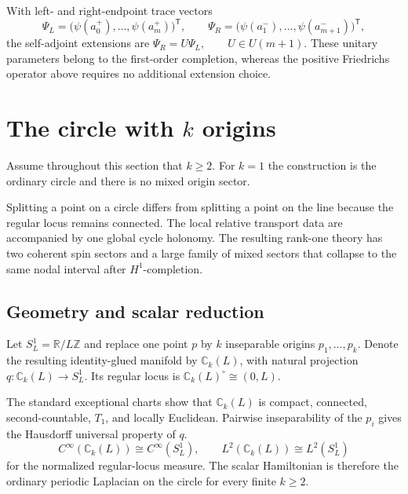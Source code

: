 \documentclass[11pt]{article}
\theoremstyle{plain}
\theoremstyle{definition}
\begin{document}
With left- and right-endpoint trace vectors
\[
  \Psi_L
  =
  \bigl(
    \psi(a_0^+),\ldots,\psi(a_m^+)
  \bigr)^{\mathsf T},
  \qquad
  \Psi_R
  =
  \bigl(
    \psi(a_1^-),\ldots,\psi(a_{m+1}^-)
  \bigr)^{\mathsf T},
\]
the self-adjoint extensions are
\(\Psi_R=U\Psi_L, \qquad U\in U(m+1)\).
These unitary parameters belong to the first-order completion, whereas the
positive Friedrichs operator above requires no additional extension choice.

\section{\texorpdfstring{The circle with \(k\) origins}{The circle with k origins}}
\label{sec:circle-k}

Assume throughout this section that
\(k\geq2\).
For \(k=1\) the construction is the ordinary circle and there is no mixed
origin sector.

Splitting a point on a circle differs from splitting a point on the line
because the regular locus remains connected. The local relative transport
data are accompanied by one global cycle holonomy. The resulting rank-one
theory has two coherent spin sectors and a large family of mixed sectors
that collapse to the same nodal interval after \(H^1\)-completion.

\subsection{Geometry and scalar reduction}
\label{subsec:circle-k-geometry}

Let \(S^1_L=\mathbb R/L\mathbb Z\) and replace one point \(p\) by \(k\) inseparable origins
\(p_1,\ldots,p_k\). Denote the resulting identity-glued manifold by
\(\mathbb C_k(L)\),
with natural projection
\(q:\mathbb C_k(L)\longrightarrow S^1_L\).
Its regular locus is
\(\mathbb C_k(L)^\circ\cong(0,L)\).

The standard exceptional charts show that \(\mathbb C_k(L)\) is compact,
connected, second-countable, \(T_1\), and locally Euclidean. Pairwise
inseparability of the \(p_i\) gives the Hausdorff universal property of
\(q\). \[
  C^\infty(\mathbb C_k(L))
  \cong
  C^\infty(S^1_L),
  \qquad
  L^2(\mathbb C_k(L))
  \cong
  L^2(S^1_L)
\]
for the normalized regular-locus measure. The scalar Hamiltonian is therefore
the ordinary periodic Laplacian on the circle for every finite \(k\geq2\).
\end{document}
